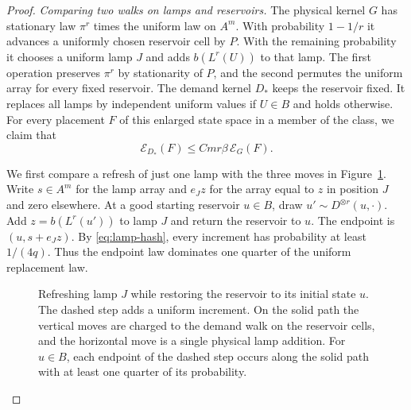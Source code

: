 \begin{proof}
\smallskip\noindent
\emph{Comparing two walks on lamps and reservoirs.}
The physical kernel $G$ has stationary law $\pi^r$ times the uniform
law on $A^m$. With probability $1-1/r$ it advances a uniformly chosen
reservoir cell by $P$. With the remaining probability it chooses a
uniform lamp $J$ and adds $b(L^r(U))$ to that lamp. The first operation
preserves $\pi^r$ by stationarity of \(P\), and the second permutes the
uniform array for every fixed reservoir.
The demand kernel $D_*$ keeps the reservoir fixed. It replaces all
lamps by independent uniform values if $U\in B$ and holds otherwise.
For every placement \(F\) of this enlarged state space in a member of
the class, we claim that
\begin{equation}\label{eq:lamp-compare}
 \mathcal E_{D_*}(F)\le Cmr\beta\,\mathcal E_G(F).
\end{equation}

We first compare a refresh of just one lamp with the three moves in
Figure~\ref{fig:lamp}. Write \(s\in A^m\) for the lamp array and
\(e_Jz\) for the array equal to \(z\) in position \(J\) and zero
elsewhere. At a good starting reservoir \(u\in B\), draw
\(u'\sim D^{\otimes r}(u,\cdot)\). Add \(z=b(L^r(u'))\) to lamp \(J\) and return the reservoir to \(u\).
The endpoint is \((u,s+e_Jz)\). By \eqref{eq:lamp-hash}, every
increment has probability at least \(1/(4q)\). Thus the endpoint
law dominates one quarter of the uniform replacement law.

\begin{figure}[tbp]
\centering
{}
\caption{Refreshing lamp \(J\) while restoring the reservoir to its
initial state \(u\). The dashed step adds a uniform increment. On the
solid path the vertical moves are charged to the demand walk on the
reservoir cells, and the horizontal move is a single physical lamp
addition. For \(u\in B\), each endpoint of the dashed step occurs
along the solid path with at least one quarter of its probability.}
\label{fig:lamp}
\end{figure}


\end{proof}
